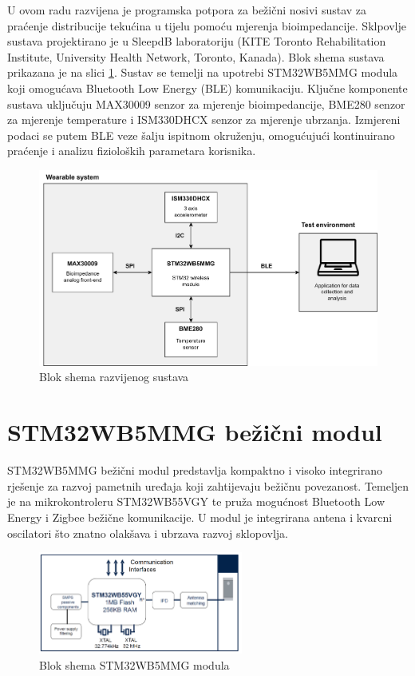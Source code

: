 \documentclass[../diplomski_rad.tex]{subfiles}
\begin{document}
\sloppy

\justifying
U ovom radu razvijena je programska potpora za bežični nosivi sustav za praćenje distribucije tekućina u tijelu pomoću mjerenja bioimpedancije. 
Sklpovlje sustava projektirano je u SleepdB laboratoriju (KITE Toronto Rehabilitation Institute, 
University Health Network, Toronto, Kanada). 
Blok shema sustava prikazana je na slici \ref{slk:blok_shema}.
Sustav se temelji na upotrebi STM32WB5MMG modula koji omogućava Bluetooth Low Energy (BLE) komunikaciju. 
Ključne komponente sustava uključuju MAX30009 senzor za mjerenje bioimpedancije, 
BME280 senzor za mjerenje temperature i ISM330DHCX senzor za mjerenje ubrzanja. 
Izmjereni podaci se putem BLE veze šalju ispitnom okruženju, omogućujući kontinuirano praćenje i analizu 
fizioloških parametara korisnika. 

\begin{figure}[htb]
    \centering
    \includegraphics[width=1\textwidth]{Figures/shema_sustava.png} 
    \caption{Blok shema razvijenog sustava}
    \label{slk:blok_shema}
\end{figure}

\section{STM32WB5MMG bežični modul}

STM32WB5MMG bežični modul predstavlja kompaktno i visoko integrirano rješenje za razvoj pametnih uređaja koji zahtijevaju bežičnu povezanost. 
Temeljen je na mikrokontroleru STM32WB55VGY te pruža mogućnost Bluetooth Low Energy i Zigbee bežične komunikacije. 
U modul je integrirana antena i kvarcni oscilatori što znatno olakšava i ubrzava razvoj sklopovlja.  

\begin{figure}[htb]
    \centering
    \includegraphics[width=0.6\textwidth]{Figures/stm32module.png} 
    \caption{Blok shema STM32WB5MMG modula \cite{stm32module}}
    \label{slk:stm32module}
\end{figure}
\end{document}
